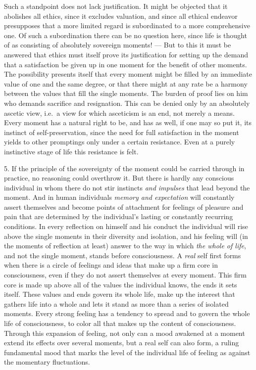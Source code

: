 \documentclass[12pt,a4paper,openany]{book}
\newcommand{\opage}[1]{\marginnote{\footnotesize\textit{[#1]}}}
\begin{document}
Such a standpoint does not lack justification. It might be objected that it abolishes all ethics,
since it excludes valuation, and since all ethical endeavor presupposes that a more limited regard is
subordinated to a more comprehensive one. Of such a subordination there can be no question here, since
life is thought of as consisting of absolutely sovereign moments! --- But to this it must be
answered that ethics must itself prove its justification for setting up the demand that a
satisfaction be given up in one moment for the benefit of other moments. The possibility presents
itself that every moment might be filled by an immediate value of one and the same degree, or that
there might at any rate be a harmony between the values that fill the single moments. The burden of
proof lies on him who demands sacrifice and resignation. This can be denied only by an absolutely
ascetic view, i.e.\ a view for which asceticism is an end, not merely a means. Every moment has a
natural right to be, and has as well, if one may so put it, its instinct of self-preservation, since
the need for full satisfaction in the moment yields to other promptings only under a certain
resistance. Even at a purely instinctive stage of life this resistance is felt.

5. If the principle of the sovereignty of the moment could be carried through in practice, no
reasoning could overthrow it. But there is hardly any conscious individual in whom there do not stir
instincts \textit{and impulses} that lead beyond the moment. And in human individuals \textit{memory and
expectation} will constantly assert themselves and become points of attachment for feelings of
pleasure and pain that are determined by the individual's
\opage{32}lasting or constantly recurring conditions. In every reflection on himself and his conduct the
individual will rise above the single moments in their diversity and isolation, and his feeling will
(in the moments of reflection at least) answer to the way in which \textit{the whole of life}, and
not the single moment, stands before consciousness. A \textit{real} self first forms when there is a
circle of feelings and ideas that make up a firm core in consciousness, even if they do not assert
themselves at every moment. This firm core is made up above all of the values the individual knows,
the ends it sets itself. These values and ends govern its whole life, make up the interest that
gathers life into a whole and lets it stand as more than a series of isolated moments. Every strong
feeling has a tendency to spread and to govern the whole life of consciousness, to color all that
makes up the content of consciousness. Through this expansion of feeling, not only can a mood
awakened at a moment extend its effects over several moments, but a real self can also form, a
ruling fundamental mood that marks the level of the individual life of feeling as against the
momentary fluctuations.
\end{document}
